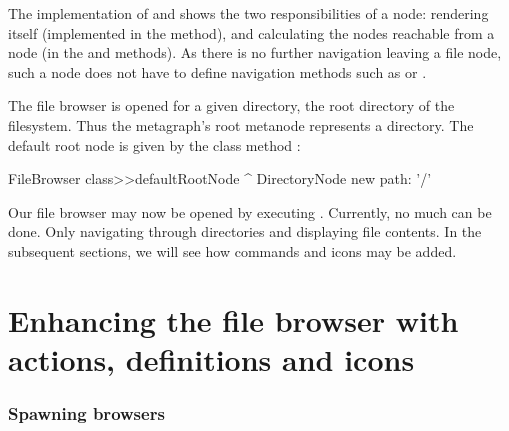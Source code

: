\documentclass[a4paper,10pt,twoside]{book}
\begin{document}
The implementation of  and  shows the two responsibilities of a node: rendering itself (implemented in the  method), and calculating the nodes reachable from a node (in the  and  methods). As there is no further navigation leaving a file node, such a node does not have to define navigation methods such as  or .


The file browser is opened for a given directory, \eg the root directory of the filesystem. Thus the metagraph's root metanode represents a directory. The default root node is given by the class method :

\begin{code}{}    
FileBrowser class>>defaultRootNode
     ^ DirectoryNode new path: '/'
\end{code}

Our file browser may now be opened by executing . Currently, no much can be done. Only navigating through directories and displaying file contents. In the subsequent sections, we will see how commands and icons may be added.



\section{Enhancing the file browser with actions, definitions and icons} \label{sec:enhancing}

\subsubsection{Spawning browsers}
\end{document}
